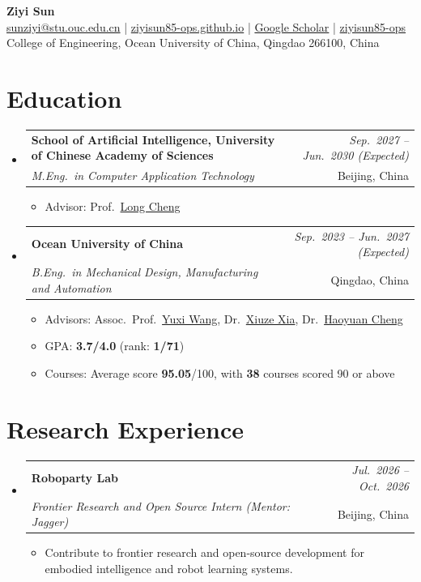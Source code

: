 \documentclass[a4paper,11pt]{article}
\makeatletter
\newcommand{\resumeSubheading}[4]{
\vspace{0.5mm}\item
    \begin{tabular*}{0.98\textwidth}[t]{l@{\extracolsep{\fill}}r}
        \textbf{#1} & \textit{\footnotesize{#4}} \\
        \textit{\footnotesize{#3}} &  \footnotesize{#2}\\
    \end{tabular*}
    \vspace{-2.4mm}
}
\newcommand{\resumeSubHeadingListStart}{\begin{itemize}[leftmargin=*,labelsep=1mm]}
\newcommand{\resumeItemListStart}{\begin{itemize}[leftmargin=*,labelsep=1mm,itemsep=0.5mm,label={$\vcenter{\hbox{\tiny$\circ$}}$}]}
\newcommand{\resumeSubHeadingListEnd}{\end{itemize}\vspace{2mm}}
\newcommand{\resumeItemListEnd}{\end{itemize}\vspace{-2mm}}
\newcommand{\socialicon}[1]{\raisebox{-0.05em}{\resizebox{!}{1em}{#1}}}
\newcommand{\headerfontiii}{\fontfamily{ppl}\selectfont}
\makeatother
\begin{document}
\headerfontiii

\begin{center}
    {\Huge\textbf{Ziyi Sun}}\\[2pt]
    \small{
    \socialicon{\faEnvelope} \href{mailto:sunziyi@stu.ouc.edu.cn}{sunziyi@stu.ouc.edu.cn} \;|\;
    \socialicon{\faGlobe} \href{https://ziyisun85-ops.github.io/}{ziyisun85-ops.github.io} \;|\;
    \socialicon{\faGraduationCap} \href{https://scholar.google.com/citations?user=9hG2NaAAAAAJ&hl=en}{Google Scholar} \;|\;
    \socialicon{\faGithub} \href{https://github.com/ziyisun85-ops}{ziyisun85-ops}
    }\\[1pt]
    \small{College of Engineering, Ocean University of China, Qingdao 266100, China}
\end{center}
\vspace{-4mm}

\section{\textbf{Education}}
\vspace{-0.4mm}
\resumeSubHeadingListStart
\resumeSubheading
{School of Artificial Intelligence, University of Chinese Academy of Sciences}{Beijing, China}
{M.Eng.\ in Computer Application Technology}{Sep.\ 2027 -- Jun.\ 2030 (Expected)}
\resumeItemListStart
\item Advisor: Prof.~\href{https://ia.cas.cn/rcdw/yjy/202404/t20240425_7131817.html}{Long Cheng}
\resumeItemListEnd
\resumeSubheading
{Ocean University of China}{Qingdao, China}
{B.Eng.\ in Mechanical Design, Manufacturing and Automation}{Sep.\ 2023 -- Jun.\ 2027 (Expected)}
\resumeItemListStart
\item Advisors: Assoc.\ Prof.~\href{https://it.ouc.edu.cn/wyx/list.htm}{Yuxi Wang}, Dr.~\href{https://it.ouc.edu.cn/xxz/list.htm}{Xiuze Xia}, Dr.~\href{https://coe.ouc.edu.cn/2023/0505/c9092a431604/page.htm}{Haoyuan Cheng}
\item GPA: \textbf{3.7/4.0} (rank: \textbf{1/71})
\item Courses: Average score \textbf{95.05}/100, with \textbf{38} courses scored 90 or above
\resumeItemListEnd
\resumeSubHeadingListEnd
\vspace{-6mm}

\section{\textbf{Research Experience}}
\vspace{-0.4mm}
\resumeSubHeadingListStart
\resumeSubheading
{Roboparty Lab}{Beijing, China}
{Frontier Research and Open Source Intern (Mentor: Jagger)}{Jul.\ 2026 -- Oct.\ 2026}
\resumeItemListStart
\item Contribute to frontier research and open-source development for embodied intelligence and robot learning systems.
\resumeItemListEnd
\resumeSubHeadingListEnd
\vspace{-6mm}
\end{document}
